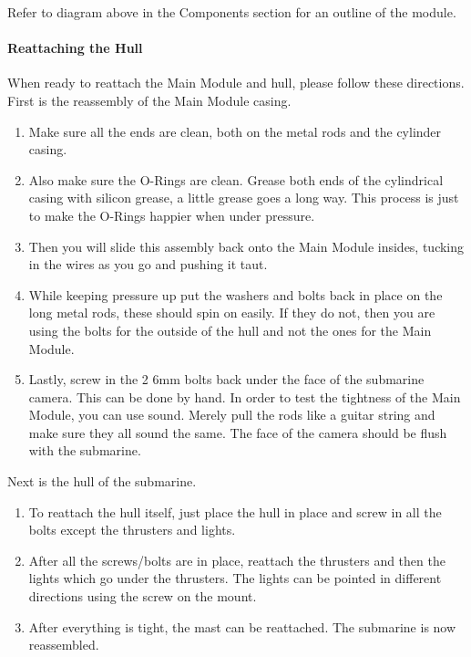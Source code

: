 \documentclass[
18pt, %
a4paper, %
oneside, %
headinclude,footinclude, %
]{scrartcl}
\begin{document}
 Refer to diagram above in the Components section for an outline of the module.
 
\paragraph{Reattaching the Hull} When ready to reattach the Main Module and hull, please follow these directions. \\

First is the reassembly of the Main Module casing.
\begin{enumerate}
	\item  Make sure all the ends are clean, both on the metal rods and the cylinder casing. 
	\item Also make sure the O-Rings are clean. Grease both ends of the cylindrical casing with silicon grease, a little grease goes a long way. This process is just to make the O-Rings happier when under pressure. 
	\item Then you will slide this assembly back onto the Main Module insides, tucking in the wires as you go and pushing it taut. 
	\item While keeping pressure up put the washers and bolts back in place on the long metal rods, these should spin on easily. If they do not, then you are using the bolts for the outside of the hull and not the ones for the Main Module. 
	\item Lastly, screw in the 2 6mm bolts back under the face of the submarine camera. This can be done by hand. In order to test the tightness of the Main Module, you can use sound. Merely pull the rods like a guitar string and make sure they all sound the same. The face of the camera should be flush with the submarine.\\
\end{enumerate}

Next is the hull of the submarine.

\begin{enumerate}
	\item To reattach the hull itself, just place the hull in place and screw in all the bolts except the thrusters and lights. 
	\item After all the screws/bolts are in place, reattach the thrusters and then the lights which go under the thrusters. The lights can be pointed in different directions using the screw on the mount. 
	\item After everything is tight, the mast can be reattached. The submarine is now reassembled.
\end{enumerate}
\end{document}
